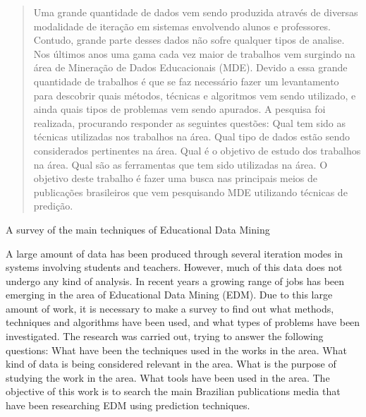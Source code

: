 \documentclass[ti]{texufpel} %
\begin{document}
\begin{abstract}

Uma grande quantidade de dados vem sendo produzida através de diversas modalidade de iteração em sistemas envolvendo alunos e professores. Contudo, grande parte desses dados não sofre qualquer tipos de analise. Nos últimos anos uma gama cada vez maior de trabalhos vem surgindo na área de Mineração de Dados Educacionais (MDE). Devido a essa grande quantidade de trabalhos é que se faz necessário fazer um levantamento para descobrir quais métodos, técnicas e algoritmos vem sendo utilizado, e ainda quais tipos de problemas vem sendo apurados. A pesquisa foi realizada, procurando responder as seguintes questões: Qual tem sido as técnicas utilizadas nos trabalhos na área. Qual tipo de dados estão sendo considerados pertinentes na área. Qual é o objetivo de estudo dos trabalhos na área. Qual são as ferramentas que tem sido utilizadas na área. O objetivo deste trabalho é fazer uma busca nas principais meios de publicações brasileiros que vem pesquisando MDE utilizando técnicas de predição.
 
\end{abstract}

\begin{englishabstract}%
  {A survey of the main techniques of Educational Data Mining}
  
A large amount of data has been produced through several iteration modes in systems involving students and teachers. However, much of this data does not undergo any kind of analysis. In recent years a growing range of jobs has been emerging in the area of Educational Data Mining (EDM). Due to this large amount of work, it is necessary to make a survey to find out what methods, techniques and algorithms have been used, and what types of problems have been investigated. The research was carried out, trying to answer the following questions: What have been the techniques used in the works in the area. What kind of data is being considered relevant in the area. What is the purpose of studying the work in the area. What tools have been used in the area. The objective of this work is to search the main Brazilian publications media that have been researching EDM using prediction techniques.

\end{englishabstract}


\listoftables
\end{document}
